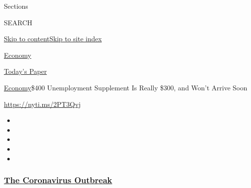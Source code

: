 Sections

SEARCH

\protect\hyperlink{site-content}{Skip to
content}\protect\hyperlink{site-index}{Skip to site index}

\href{https://www.nytimes3xbfgragh.onion/section/business/economy}{Economy}

\href{https://myaccount.nytimes3xbfgragh.onion/auth/login?response_type=cookie\&client_id=vi}{}

\href{https://www.nytimes3xbfgragh.onion/section/todayspaper}{Today's
Paper}

\href{/section/business/economy}{Economy}\textbar{}\$400 Unemployment
Supplement Is Really \$300, and Won't Arrive Soon

\url{https://nyti.ms/2PT3Qvj}

\begin{itemize}
\item
\item
\item
\item
\item
\end{itemize}

\hypertarget{the-coronavirus-outbreak}{%
\subsubsection{\texorpdfstring{\href{https://www.nytimes3xbfgragh.onion/news-event/coronavirus?name=styln-coronavirus-markets\&region=TOP_BANNER\&block=storyline_menu_recirc\&action=click\&pgtype=Article\&impression_id=e8f45dc0-f527-11ea-afee-9f6e96515e5b\&variant=undefined}{The
Coronavirus
Outbreak}}{The Coronavirus Outbreak}}\label{the-coronavirus-outbreak}}

